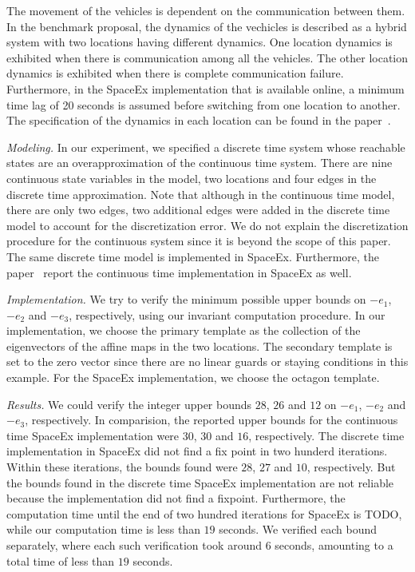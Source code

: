 The movement of the vehicles is dependent on the communication between
them.  In the benchmark proposal, the dynamics of the vechicles is
described as a hybrid system with two locations having different
dynamics.  One location dynamics is exhibited when there is
communication among all the vehicles.  The other location dynamics is
exhibited when there is complete communication failure.  Furthermore,
in the SpaceEx implementation that is available online, a minimum time
lag of 20 seconds is assumed before switching from one location to
another.  The specification of the dynamics in each location can be
found in the paper~\cite{}.

\emph{Modeling.}  In our experiment, we specified a discrete time
system whose reachable states are an overapproximation of the
continuous time system.  There are nine continuous state variables in
the model, two locations and four edges in the discrete time
approximation.  Note that although in the continuous time model, there
are only two edges, two additional edges were added in the discrete
time model to account for the discretization error.  We do not explain
the discretization procedure for the continuous system since it is
beyond the scope of this paper.  The same discrete time model is
implemented in SpaceEx.  Furthermore, the paper~\cite{TODO} report the
continuous time implementation in SpaceEx as well.

\emph{Implementation.}  We try to verify the minimum possible upper
bounds on $-e_1$, $-e_2$ and $-e_3$, respectively, using our invariant
computation procedure.  In our implementation, we choose the primary
template as the collection of the eigenvectors of the affine maps in
the two locations.  The secondary template is set to the zero vector
since there are no linear guards or staying conditions in this
example.  For the SpaceEx implementation, we choose the octagon
template.

\emph{Results.}  We could verify the integer upper bounds $28$, $26$
and $12$ on $-e_1$, $-e_2$ and $-e_3$, respectively.  In comparision,
the reported upper bounds for the continuous time SpaceEx
implementation were $30$, $30$ and $16$, respectively.  The discrete
time implementation in SpaceEx did not find a fix point in two hunderd
iterations.  Within these iterations, the bounds found were $28$, $27$
and $10$, respectively.  But the bounds found in the discrete time
SpaceEx implementation are not reliable because the implementation did
not find a fixpoint.  Furthermore, the computation time until the end
of two hundred iterations for SpaceEx is TODO, while our computation
time is less than $19$ seconds.  We verified each bound separately,
where each such verification took around $6$ seconds, amounting to a
total time of less than $19$ seconds.  

